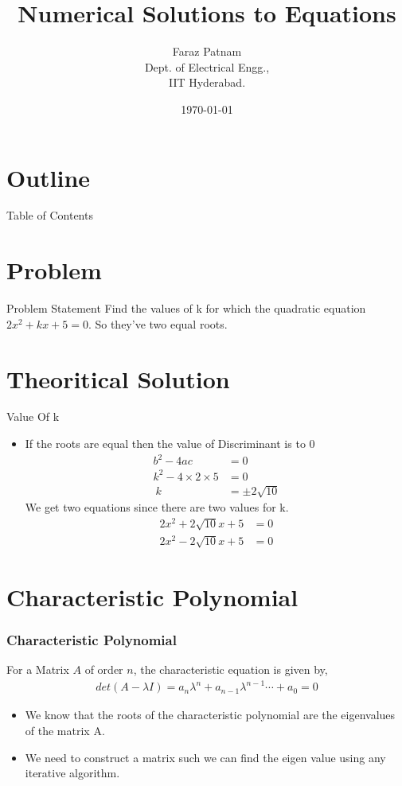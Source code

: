 \documentclass{beamer}
\title{Numerical Solutions to Equations}
\author{Faraz Patnam\\ Dept. of Electrical Engg.,\\IIT Hyderabad.}
\date{\today}
\providecommand{\brak}[1]{\ensuremath{\left(#1\right)}}
\theoremstyle{remark}
\numberwithin{equation}{section}
\begin{document}
\begin{frame}
\titlepage
\end{frame}

\section*{Outline}
\begin{frame}{Table of Contents}
    \tableofcontents
\end{frame}

\section{Problem}
\begin{frame}{Problem Statement}
    Find the values of k for which the quadratic equation $2x^2 + kx + 5 = 0$. So they've two equal roots.
\end{frame}

\section{Theoritical Solution}
\begin{frame}{Value Of k}
    \begin{itemize}
    \item If the roots are equal then the value of Discriminant is to $0$
        \begin{align}
            b^2 - 4ac &= 0\\
            k^2 - 4 \times 2 \times 5 &= 0\\\
            k &= \pm 2\sqrt{10}
        \end{align}
        We get two equations since there are two values for k.
        \begin{align}
            2x^2 + 2\sqrt{10}x + 5 &= 0 \label{Quad1}\\
            2x^2 - 2\sqrt{10}x + 5 &= 0 \label{Quad2}
        \end{align}
\end{itemize}
\end{frame}
\section{Characteristic Polynomial}
\begin{frame}
  \frametitle{Characteristic Polynomial}
  For a Matrix $A$ of order $n$, the characteristic equation is given by,
\begin{align}
  det\brak{A - \lambda I} = a_n \lambda ^n + a_{n-1} \lambda ^{n-1} \cdots + a_0 = 0
 \end{align}
 \begin{itemize}
     \item We know that the roots of the characteristic polynomial are the eigenvalues of the matrix A. 
     \item We need to construct a matrix such we can find the eigen value using any iterative algorithm.
 \end{itemize}
\end{frame}
\end{document}
